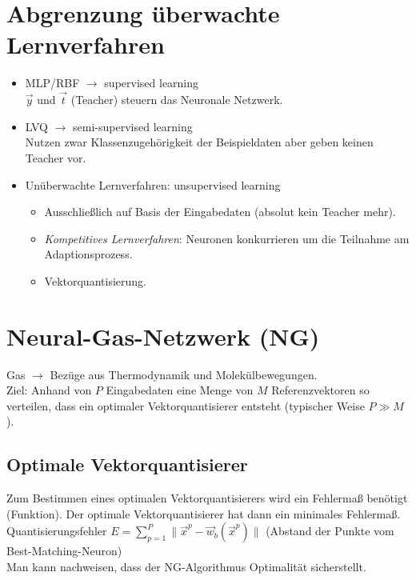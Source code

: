 \section{Abgrenzung überwachte Lernverfahren}
\begin{itemize}
\item MLP/RBF $\to$ supervised learning\\
$\vec{y}$ und $\vec{t}$ (Teacher) steuern das Neuronale Netzwerk.
\item LVQ $\to$ semi-supervised learning\\
Nutzen zwar Klassenzugehörigkeit der Beispieldaten aber geben keinen Teacher vor.
\item Unüberwachte Lernverfahren: unsupervised learning
\begin{itemize}
\item Ausschließlich auf Basis der Eingabedaten (absolut kein Teacher mehr).
\item \emph{Kompetitives Lernverfahren}: Neuronen konkurrieren um die Teilnahme am Adaptionsprozess.
\item Vektorquantisierung.
\end{itemize}
\end{itemize}

\section{Neural-Gas-Netzwerk (NG)}
Gas $\to$ Bezüge aus Thermodynamik und Molekülbewegungen.\\
Ziel: Anhand von $P$ Eingabedaten eine Menge von $M$ Referenzvektoren so verteilen, dass ein optimaler Vektorquantisierer entsteht (typischer Weise $P \gg M$).

\subsection{Optimale Vektorquantisierer}
Zum Bestimmen eines optimalen Vektorquantisierers wird ein Fehlermaß benötigt (Funktion). Der optimale Vektorquantisierer hat dann ein minimales Fehlermaß.\\
Quantisierungsfehler $E = \sum_{p=1}^P \| \vec{x}^p-\vec{w}_b(\vec{x}^p)\|$ (Abstand der Punkte vom Best-Matching-Neuron)\\
Man kann nachweisen, dass der NG-Algorithmus Optimalität sicherstellt.


